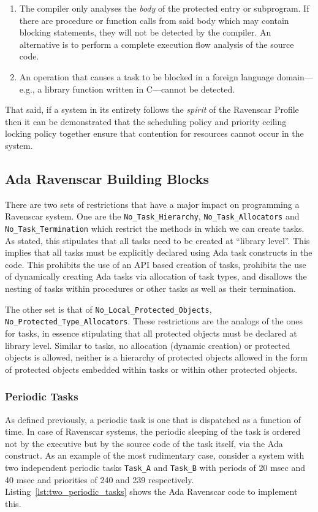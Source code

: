 \begin{enumerate}
\item{The compiler only analyses the \emph{body} of the protected
  entry or subprogram. If there are procedure or function calls from
  said body which may contain blocking statements, they will not be
  detected by the compiler. An alternative is to perform a complete
  execution flow analysis of the source code.}
\item{An operation that causes a task to be blocked in a foreign
  language domain---e.g., a library function written in C---cannot be
  detected.}
\end{enumerate}

That said, if a system in its entirety follows the \emph{spirit} of
the Ravenscar Profile then it can be demonstrated that the scheduling
policy and priority ceiling locking policy together ensure that
contention for resources cannot occur in the system.

\subsection{Ada Ravenscar Building Blocks}
There are two sets of restrictions that have a major impact on
programming a Ravenscar system. One are the
\texttt{No\_Task\_Hierarchy}, \texttt{No\_Task\_Allocators} and
\texttt{No\_Task\_Termination} which restrict the methods in which we
can create tasks. As stated, this stipulates that all tasks need to be
created at ``library level''. This implies that all tasks must be
explicitly declared using Ada task constructs in the code. This
prohibits the use of an API based creation of tasks, prohibits the use
of dynamically creating Ada tasks via allocation of task types, and
disallows the nesting of tasks within procedures or other tasks as
well as their termination.

The other set is that of \texttt{No\_Local\_Protected\_Objects},
\texttt{No\_Protected\_Type\_Allocators}. These restrictions are the
analogs of the ones for tasks, in essence stipulating that all
protected objects must be declared at library level. Similar to tasks,
no allocation (dynamic creation) or protected objects is allowed,
neither is a hierarchy of protected objects allowed in the form of
protected objects embedded within tasks or within other protected
objects.

\subsubsection{Periodic Tasks}
As defined previously, a periodic task is one that is dispatched as a
function of time. In case of Ravenscar systems, the periodic sleeping
of the task is ordered not by the executive but by the source code of
the task itself, via the  Ada construct. As an example
of the most rudimentary case, consider a system with two independent
periodic tasks \texttt{Task\_A} and \texttt{Task\_B} with periods of
20 msec and 40 msec and priorities of 240 and 239
respectively. Listing~\ref{lst:two_periodic_tasks} shows the Ada
Ravenscar code to implement this.


